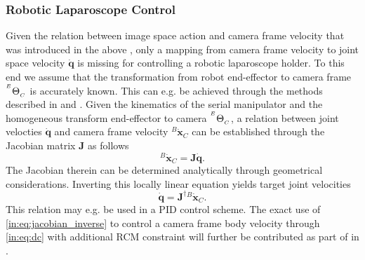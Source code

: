 
\subsubsection{Robotic Laparoscope Control}
\label{in:sec:robotic_laparoscope_control}
Given the relation between image space action and camera frame velocity that was introduced in the above , only a mapping from camera frame velocity to joint space velocity $\dot{\mathbf{q}}$ is missing for controlling a robotic laparoscope holder. To this end we assume that the transformation from robot end-effector to camera frame ${}^{^E}\Theta_{_C}$ is accurately known. This can e.g. be achieved through the methods described in  and . Given the kinematics of the serial manipulator and the homogeneous transform end-effector to camera ${}^{^E}\Theta_{_C}$, a relation between joint velocties $\dot{\mathbf{q}}$ and camera frame velocity ${}^B\dot{\mathbf{x}}_C$ can be established through the Jacobian matrix $\mathbf{J}$ as follows
\begin{equation}
    {}^B\dot{\mathbf{x}}_C = \mathbf{J} \dot{\mathbf{q}}.
\end{equation}
The Jacobian therein can be determined analytically through geometrical considerations. Inverting this locally linear equation yields target joint velocities
\begin{equation}
    \dot{\mathbf{q}} = \mathbf{J}^{\dagger}{}^B\dot{\mathbf{x}}_C.
    \label{in:eq:jacobian_inverse}
\end{equation}
This relation may e.g. be used in a PID control scheme. The exact use of \eqref{in:eq:jacobian_inverse} to control a camera frame body velocity through \eqref{in:eq:dc} with additional RCM constraint will further be contributed as part of  in .





